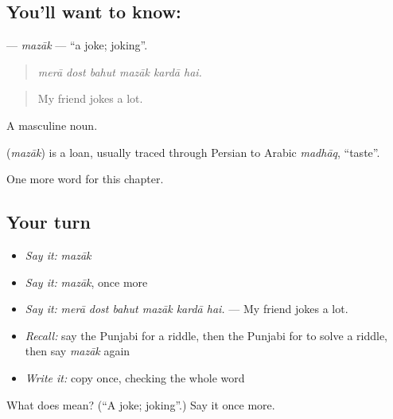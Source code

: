 \subsection*{You'll want to know: }
\textbf{} — \emph{mazāk} — \textquotedblleft{}a joke; joking\textquotedblright{}.

\begin{quote}
     
\end{quote}

\begin{quote}
\emph{merā dost bahut mazāk kardā hai.}
\end{quote}

\begin{quote}
My friend jokes a lot.
\end{quote}

A masculine noun.

\begin{cousinweb}
\textbf{} (\emph{mazāk}) is a loan, usually traced through Persian to Arabic \emph{madhāq}, \textquotedblleft{}taste\textquotedblright{}.
\end{cousinweb}

\begin{grammarlens}[title={What you've built}]
One more word for this chapter.
\end{grammarlens}

\subsection*{Your turn}
\begin{itemize}
\raggedright
  \item \emph{Say it:} \emph{mazāk}
  \item \emph{Say it:} \emph{mazāk}, once more
  \item \emph{Say it:} \emph{merā dost bahut mazāk kardā hai.} — My friend jokes a lot.
  \item \emph{Recall:} say the Punjabi for a riddle, then the Punjabi for to solve a riddle, then say \emph{mazāk} again
  \item \emph{Write it:} copy \textbf{} once, checking the whole word
\end{itemize}

\begin{tcolorbox}[breakable,colback=teal!4,colframe=teal!35!black,title={Before you move on}]
What does  mean? (\textquotedblleft{}A joke; joking\textquotedblright{}.) Say it once more.
\end{tcolorbox}

